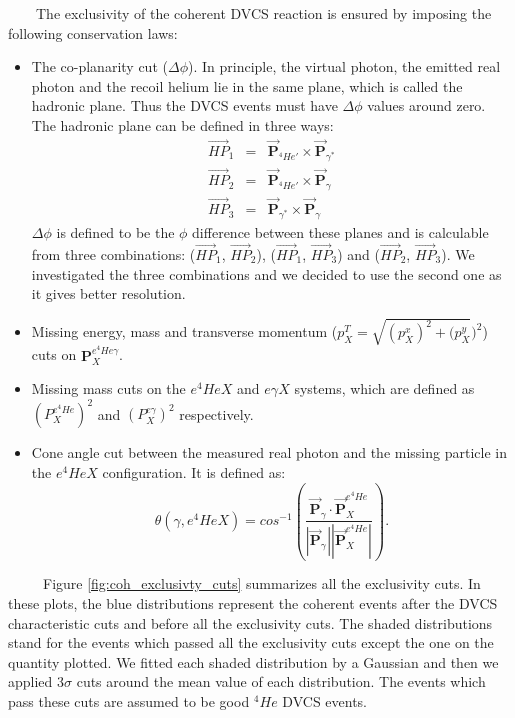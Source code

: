 ~~~~The exclusivity of the coherent DVCS reaction is ensured by imposing the following conservation laws:
\begin{itemize}
\item The co-planarity cut ($\Delta \phi$). In principle, the virtual photon, the emitted real photon and the recoil helium lie in the same plane, which is called the hadronic plane. Thus the DVCS events must have $\Delta \phi$ values around zero. The hadronic plane can be defined in three ways:
\begin{eqnarray}
\overrightarrow{HP}_{1} &=& \overrightarrow{\mathbf{P}}_{^{4}He'} \times \overrightarrow{\mathbf{P}}_{\gamma^{*}}\\
\overrightarrow{HP}_{2} &=& \overrightarrow{\mathbf{P}}_{^{4}He'}  \times \overrightarrow{\mathbf{P}}_{\gamma}\\
\overrightarrow{HP}_{3} &=& \overrightarrow{\mathbf{P}}_{\gamma^{*}} \times \overrightarrow{\mathbf{P}}_{\gamma}
\end{eqnarray}
$\Delta \phi$ is defined to be the $\phi$ difference between these planes and is calculable from three combinations: ($\overrightarrow{HP}_{1}$, $\overrightarrow{HP}_{2}$), ($\overrightarrow{HP}_{1}$, $\overrightarrow{HP}_{3}$) and ($\overrightarrow{HP}_{2}$, $\overrightarrow{HP}_{3}$). We investigated the three combinations and we decided to use the second one as it gives better resolution.

\item Missing energy, mass and transverse momentum ($p^{T}_{X} = \sqrt{(p^{x}_{X})^2 + (p^{y}_{X}})^2$) cuts on $\mathbf{P}^{e^{4}He\gamma}_{X}$.

\item Missing mass cuts on the $e^{4}HeX$ and $e\gamma X$ systems, which are defined as $(P^{e^{4}He}_{X})^{2}$ and $(P^{e\gamma}_{X})^{2}$ respectively.

\item Cone angle cut between the measured real photon and the missing particle in the $e^{4}HeX$ configuration. It is defined as:
\begin{equation}
\theta(\gamma, e^{4}HeX) = cos^{-1} \left( \frac{\overrightarrow{\mathbf{P}}_{\gamma} \cdot \overrightarrow{\mathbf{P}}^{e^{4}He}_{X}}{|\overrightarrow{\mathbf{P}}_{\gamma^{}}| |\overrightarrow{\mathbf{P}}^{e^{4}He}_{X}|}   \right).
\end{equation}
\end{itemize}
~~~~~Figure \ref{fig:coh_exclusivty_cuts} summarizes all the exclusivity cuts. In these plots, the blue distributions represent the coherent events after the DVCS characteristic cuts and before all the exclusivity cuts. The shaded distributions stand for the events which passed all the exclusivity cuts except the one on the quantity plotted. We fitted each shaded distribution by a Gaussian and then we applied  3$\sigma$ cuts around the mean value of each distribution. The events which pass these cuts are assumed to be good $^{4}He$ DVCS events. 
~\\
~\\

